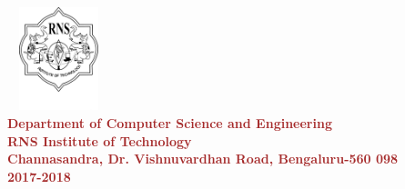\begin{titlepage}
\begin{center}
\includegraphics[width=3cm, height=3cm]{./RNS_logo.png}\\[0.1in]

\textup{\normalsize {\textcolor{brown}{\bf Department of Computer Science and Engineering} \\ {\textcolor{brown}{\bf \bf{RNS Institute of Technology}}}}}\\
\textup{\small {\textcolor{brown}{\bf Channasandra, Dr. Vishnuvardhan Road, Bengaluru-560 098}\\ \textbf {\textcolor{brown}{2017-2018}}}}




\end{center}
\end{titlepage}
